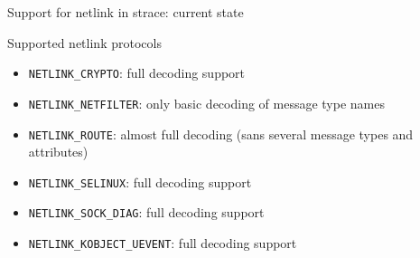 \documentclass[unicode,aspectratio=169]{beamer}
\begin{document}
\begin{frame}{Support for netlink in strace: current state}
\begin{block}{Supported netlink protocols}
\begin{itemize}
  \item \texttt{NETLINK\_CRYPTO}: full decoding support
  \item \texttt{NETLINK\_NETFILTER}: only basic decoding of message type names
  \item \texttt{NETLINK\_ROUTE}: almost full decoding (sans several message
        types and attributes)
  \item \texttt{NETLINK\_SELINUX}: full decoding support
  \item \texttt{NETLINK\_SOCK\_DIAG}: full decoding support
  \item \texttt{NETLINK\_KOBJECT\_UEVENT}: full decoding support
\end{itemize}
\end{block}
\end{frame}
\end{document}
